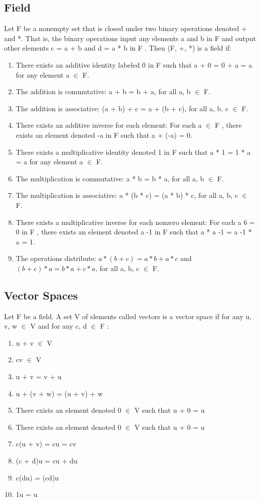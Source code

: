 \documentclass{article}
\begin{document}
\subsection{Field}
Let F be a nonempty set that is closed under two binary operations denoted +
and *. That is, the binary operations input any elements a and b in F and output other elements
c = a + b and d = a * b in F . Then (F, +, *) is a field if:

\begin{enumerate}
  \item There exists an additive identity labeled 0 in F such that a + 0 = 0 + a = a for any element a $\in$ F.
  \item The addition is commutative: a + b = b + a, for all a, b $\in$ F.
  \item The addition is associative: (a + b) + c = a + (b + c), for all a, b, c $\in$ F.
  \item There exists an additive inverse for each element: For each a $\in$ F , there exists an element denoted -a in F such that a + (-a) = 0.
  \item There exists a multiplicative identity denoted 1 in F such that a * 1 = 1 * a = a for any element a $\in$ F.
  \item The multiplication is commutative: a * b = b * a, for all a, b $\in$ F.
  \item The multiplication is associative: a * (b * c) = (a * b) * c, for all a, b, c $\in$ F.
  \item There exists a multiplicative inverse for each nonzero element: For each a 6 = 0 in F , there exists an element denoted a -1 in F such that a * a -1 = a -1 * a = 1.
  \item The operations distribute: $a * (b + c) = a * b + a * c$ and $(b + c) * a = b * a + c * a$, for all a, b, c $\in$ F.
\end{enumerate}

\subsection{Vector Spaces}
Let F be a field. A set V of elements called vectors is a vector space if for any u, v, w $\in$ V and for any c, d $\in$ F :
\begin{enumerate}
  \item u + v $\in$ V
  \item cv $\in$ V
  \item u + v = v + u
  \item u + (v + w) = (u + v) + w
  \item There exists an element denoted 0 $\in$ V such that u + 0 = u
  \item There exists an element denoted 0 $\in$ V such that u + 0 = u
  \item c(u + v) = cu = cv
  \item (c + d)u = cu + du
  \item c(du) = (cd)u
  \item 1u = u
\end{enumerate}
\end{document}
